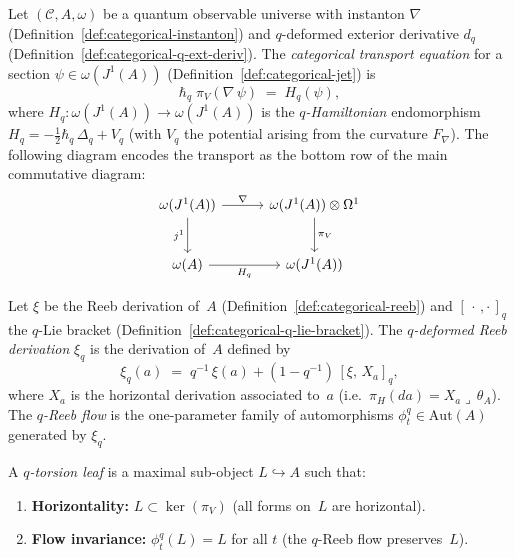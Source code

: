 \begin{definition}
\label{def:categorical-transport}
\leanok
Let $(\mathcal{C}, A, \omega)$ be a quantum observable universe with
instanton $\nabla$ (Definition~\ref{def:categorical-instanton}) and
$q$-deformed exterior derivative $d_q$
(Definition~\ref{def:categorical-q-ext-deriv}).  The \emph{categorical
transport equation} for a section $\psi \in \omega(J^1(A))$
(Definition~\ref{def:categorical-jet}) is
\begin{equation}\label{eq:categorical-transport}
  \hbar_q\;\pi_V(\nabla\,\psi) \;=\; H_q(\psi),
\end{equation}
where $H_q \colon \omega(J^1(A)) \to \omega(J^1(A))$ is the
\emph{$q$-Hamiltonian} endomorphism
$H_q = -\tfrac{1}{2}\hbar_q\,\Delta_q + V_q$
(with $V_q$ the potential arising from the curvature $F_\nabla$).
The following diagram encodes the transport as the bottom row of the
main commutative diagram:
\begin{equation}\label{eq:transport-cd}
\begin{tikzcd}[row sep=2.5em, column sep=3em]
  \omega(J^1(A)) \ar[r, "\nabla"] \ar[d, "j^1"']
  & \omega(J^1(A)) \otimes \Omega^1 \ar[d, "\pi_V"] \\
  \omega(A) \ar[r, "H_q"']
  & \omega(J^1(A))
\end{tikzcd}
\end{equation}
\end{definition}

\begin{definition}
\label{def:categorical-q-reeb-flow}
Let $\xi$ be the Reeb derivation of~$A$
(Definition~\ref{def:categorical-reeb}) and $[\,\cdot\,,\cdot\,]_q$
the $q$-Lie bracket (Definition~\ref{def:categorical-q-lie-bracket}).
The \emph{$q$-deformed Reeb derivation} $\xi_q$ is the derivation of~$A$
defined by
\[
  \xi_q(a) \;=\; q^{-1}\,\xi(a)
  + (1 - q^{-1})\,[\xi,\, X_a]_q,
\]
where $X_a$ is the horizontal derivation associated to~$a$ (i.e.\
$\pi_H(da) = X_a \lrcorner\, \theta_A$).  The \emph{$q$-Reeb flow}
is the one-parameter family of automorphisms
$\phi_t^q \in \mathrm{Aut}(A)$ generated by $\xi_q$.
\end{definition}

\begin{definition}
\label{def:categorical-q-torsion-leaf}
A \emph{$q$-torsion leaf} is a maximal sub-object
$L \hookrightarrow A$ such that:
\begin{enumerate}
  \item \textbf{Horizontality:}\; $L \subset \ker(\pi_V)$
        (all forms on~$L$ are horizontal).
  \item \textbf{Flow invariance:}\; $\phi_t^q(L) = L$ for all
        $t$ (the $q$-Reeb flow preserves~$L$).
\end{enumerate}
\end{definition}


